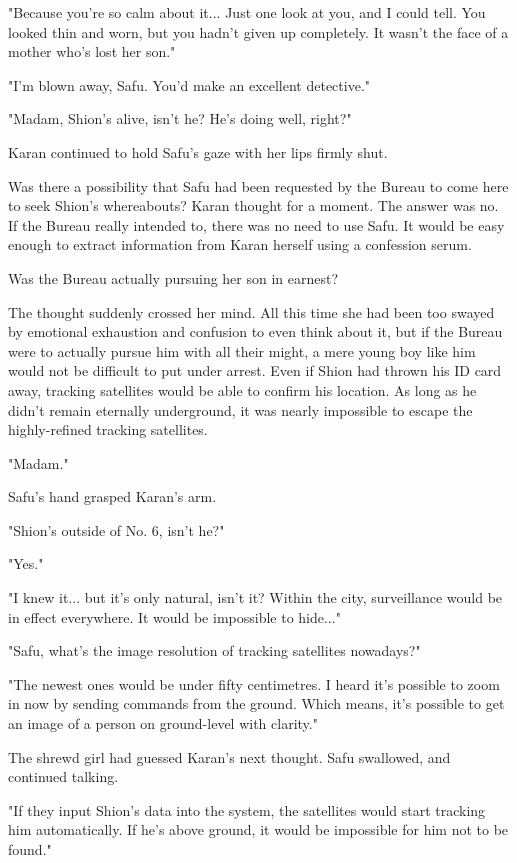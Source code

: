 "Because you're so calm about it... Just one look at you, and I could
tell. You looked thin and worn, but you hadn't given up completely. It
wasn't the face of a mother who's lost her son."

"I'm blown away, Safu. You'd make an excellent detective."

"Madam, Shion's alive, isn't he? He's doing well, right?"

Karan continued to hold Safu's gaze with her lips firmly shut.

Was there a possibility that Safu had been requested by the Bureau to
come here to seek Shion's whereabouts? Karan thought for a moment. The
answer was no. If the Bureau really intended to, there was no need to
use Safu. It would be easy enough to extract information from Karan
herself using a confession serum.

Was the Bureau actually pursuing her son in earnest?

The thought suddenly crossed her mind. All this time she had been too
swayed by emotional exhaustion and confusion to even think about it, but
if the Bureau were to actually pursue him with all their might, a mere
young boy like him would not be difficult to put under arrest. Even if
Shion had thrown his ID card away, tracking satellites would be able to
confirm his location. As long as he didn't remain eternally underground,
it was nearly impossible to escape the highly-refined tracking
satellites.

"Madam."

Safu's hand grasped Karan's arm.

"Shion's outside of No. 6, isn't he?"

"Yes."

"I knew it... but it's only natural, isn't it? Within the city,
surveillance would be in effect everywhere. It would be impossible to
hide..."

"Safu, what's the image resolution of tracking satellites nowadays?"

"The newest ones would be under fifty centimetres. I heard it's possible
to zoom in now by sending commands from the ground. Which means, it's
possible to get an image of a person on ground-level with clarity."

The shrewd girl had guessed Karan's next thought. Safu swallowed, and
continued talking.

"If they input Shion's data into the system, the satellites would start
tracking him automatically. If he's above ground, it would be impossible
for him not to be found."

